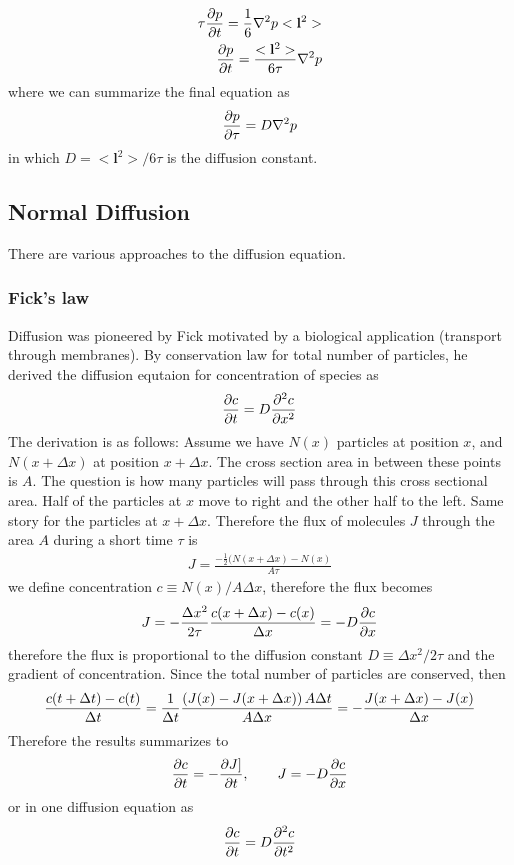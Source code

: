 \begin{align}
  \tau \frac{\partial p }{\partial t}  = \frac{1}{6} \nabla^2p < \mathbf{l}^2> \\
  \frac{\partial p }{\partial t}  = \frac{<\mathbf{l}^2>}{6\tau} \nabla^2p 
\end{align}
%
where we can summarize the final equation as
%
\begin{align}
  \frac{\partial p}{\partial \tau}  = D \nabla^2p
\end{align}
%
in which $D =  <\mathbf{l}^2> / 6\tau$ is the diffusion constant. 



\subsection{Normal Diffusion}

There are various approaches to the diffusion equation. 
\subsubsection{Fick's law}
%
Diffusion was pioneered by Fick motivated by a biological application
(transport through membranes). By conservation law for total number of
particles, he derived the diffusion equtaion for concentration of
species as
%
\begin{align}
  \frac{\partial c}{\partial t} = D \frac{\partial^{2} c}{\partial x^2}  
\end{align}
%
The derivation is as follows: Assume we have $N(x)$ particles at
position $x$, and $N(x + \Delta x) $ at position $x+\Delta x$. The
cross section area in between these points is $A$. The question is how
many particles will pass through this cross sectional area. Half of
the particles at $x$ move to right and the other half to the
left. Same story for the particles at $x + \Delta x$. Therefore the
flux of molecules $J$ through the area $A$ during a short time $\tau$
is
%
\begin{align}
  J = \frac{ -\frac{1}{2} ( N(x+ \Delta x) - N(x)  }{A \tau} 
\end{align}
%
we define concentration $c \equiv {N(x) }/ {A \Delta x} $, therefore
the flux becomes
%
\begin{align}
  J = - \frac{\Delta x ^{2}}{2 \tau} \frac{ c(x + \Delta x) - c(x) }{\Delta x} = - D \frac{\partial c }{\partial x }  
\end{align}
%
therefore the flux is proportional to the diffusion constant $D \equiv
\Delta x ^2/2 \tau$ and the gradient of concentration.
%
Since the total number of particles are conserved, then
%
\begin{align}
  \frac{c(t+\Delta t) - c(t)}{\Delta t} = \frac{1}{\Delta t} \frac{\left( J(x) - J(x+\Delta x)\right) A\Delta t }{A \Delta x} =   - \frac{ J(x+\Delta x) - J(x) }{ \Delta x} 
\end{align}
%
Therefore the results summarizes to
%
\begin{align}
  \frac{\partial c}{\partial t}  = - \frac{\partial J]}{\partial t}, \qquad J = -D \frac{\partial c}{\partial x} 
\end{align}
%
or in one diffusion equation as
%
\begin{align}
  \frac{\partial c}{\partial t}  = D \frac{\partial ^{2}c }{\partial t^2} 
\end{align}
%

